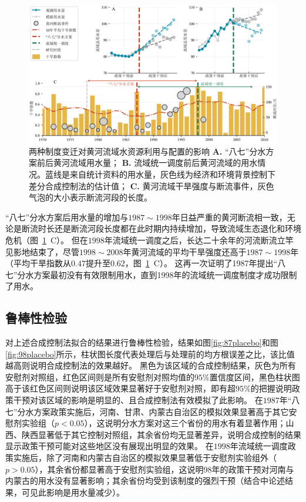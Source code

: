 \begin{figure}[!htb]
	\centering
	\includegraphics[width=\linewidth]{img/ch5/ch5_results.png}
	\caption[两种制度变迁对黄河流域水资源利用与配置的影响]{
        两种制度变迁对黄河流域水资源利用与配置的影响
        \textbf{A.} “八七”分水方案前后黄河流域用水量；
        \textbf{B.} 流域统一调度前后黄河流域的用水情况。蓝线是来自统计资料的用水量，灰色线为经济和环境背景控制下差分合成控制法的估计值；
        \textbf{C.} 黄河流域干旱强度与断流事件，灰色气泡的大小表示断流河段的长度。
	}\label{ch5:fig:main_results}
\end{figure}

“八七”分水方案后用水量的增加与$1987 \sim 1998$年日益严重的黄河断流相一致，无论是断流时长还是断流河段长度都在此时期内持续增加，导致流域生态退化和环境危机（图~\ref{ch5:fig:main_results}~C）。
但在$1998$年流域统一调度之后，长达二十余年的河流断流立竿见影地结束了，尽管$1998 \sim 2008$年黄河流域的平均干旱强度还高于$1987 \sim 1998$年（平均干旱指数从$0.47$提升至$0.62$，图~\ref{ch5:fig:main_results}~C）。
这再一次证明了1987年提出“八七”分水方案最初没有有效限制用水，直到1998年的流域统一调度制度才成功限制了用水。

\subsection{鲁棒性检验}

对上述合成控制法拟合的结果进行鲁棒性检验，结果如图\ref{fig:87placebo}和图\ref{fig:98placebo}所示，柱状图长度代表处理后与处理前的均方根误差之比，该比值越高则说明合成控制法的效果越好。
黑色为该区域的合成控制结果，灰色为所有安慰剂对照组，红色区间则是所有安慰剂对照均值的$95\%$置信度区间，黑色柱状图高于该红色区间则说明该区域效果显著好于安慰剂对照，即有超$95\%$的把握说明政策干预对该区域的影响是明显的、且合成控制法有效模拟了此影响。
在$1987$年“八七”分水方案政策实施后，河南、甘肃、内蒙古自治区的模拟效果显著高于其它安慰剂实验组（$p < 0.05$），这说明分水方案对这三个省份的用水有着显著作用；山西、陕西显著低于其它控制对照组，其余省份均无显著差异，说明合成控制的结果显示政策干预可能对这些地区没有展现出明显的效果。
在$1998$年流域统一调度政策实施后，除了河南和内蒙古自治区的模拟效果显著低于安慰剂实验组外（$p > 0.05$），其余省份都显著高于安慰剂实验组，这说明98年的政策干预对河南与内蒙古的用水没有显著影响；其余省份均受到该制度的强烈干预（结合中论述结果，可见此影响是用水量减少）。

